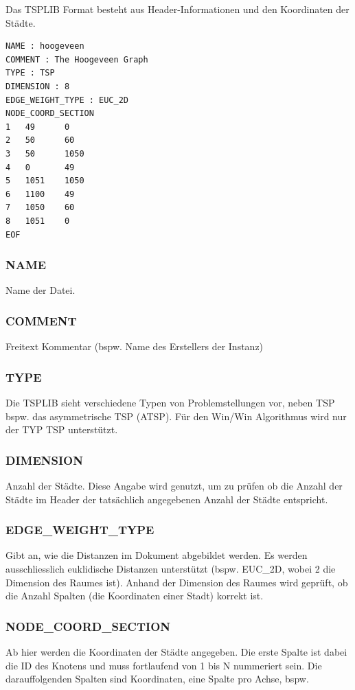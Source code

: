 \documentclass[11pt,a4paper]{article}
\begin{document}
Das TSPLIB Format besteht aus Header-Informationen und den Koordinaten der Städte.

\begin{verbatim}
NAME : hoogeveen 
COMMENT : The Hoogeveen Graph 
TYPE : TSP 
DIMENSION : 8 
EDGE_WEIGHT_TYPE : EUC_2D
NODE_COORD_SECTION
1   49      0   
2   50      60  
3   50      1050
4   0       49  
5   1051    1050
6   1100    49  
7   1050    60  
8   1051    0   
EOF
\end{verbatim}

\subsubsection{NAME}
Name der Datei.

\subsubsection{COMMENT}
Freitext Kommentar (bspw. Name des Erstellers der Instanz)

\subsubsection{TYPE}
Die TSPLIB sieht verschiedene Typen von Problemstellungen vor, neben TSP bspw. das asymmetrische TSP (ATSP). Für den Win/Win Algorithmus wird nur der TYP TSP unterstützt.

\subsubsection{DIMENSION}
Anzahl der Städte. Diese Angabe wird genutzt, um zu prüfen ob die Anzahl der Städte im Header der tatsächlich angegebenen Anzahl der Städte entspricht.

\subsubsection{EDGE\_WEIGHT\_TYPE}
Gibt an, wie die Distanzen im Dokument abgebildet werden. Es werden ausschliesslich euklidische Distanzen unterstützt (bspw. EUC\_2D, wobei 2 die Dimension des Raumes ist).
Anhand der Dimension des Raumes wird geprüft, ob die Anzahl Spalten (die Koordinaten einer Stadt) korrekt ist.

\subsubsection{NODE\_COORD\_SECTION}
Ab hier werden die Koordinaten der Städte angegeben. Die erste Spalte ist dabei die ID des Knotens und muss fortlaufend von 1 bis N nummeriert sein. Die darauffolgenden Spalten sind Koordinaten, eine Spalte pro Achse, bspw.
\end{document}
